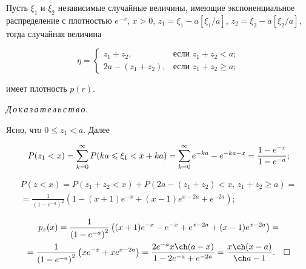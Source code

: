     \begin{lemma}{}

        Пусть $\xi_1$  и $\xi_2$ независимые случайные величины{\rm ,} имеющие экспоненциальное распределение с плотностью $e^{-x}${\rm ,} $x>0${\rm ,} $z_1=\xi_1-a\left[{\xi_1}/{a}\right]${\rm ,} $z_2=\xi_2-a[{\xi_2}/{a}]${\rm ,} тогда случайная величина

        \[

            \eta=\begin{cases}

                z_1+z_2,&\text{если $z_1+z_2<a$;}\\

                2a-(z_1+z_2),&\text{если $z_1+z_2\geqslant a;$}

            \end{cases}

        \]

        имеет плотность $p(r)${\rm .}

\end{lemma}



\smallskip

{\it Д\,о\,к\,а\,з\,а\,т\,е\,л\,ь\,с\,т\,в\,о.}

Ясно, что $0\leqslant z_1<a$. Далее

\[P(z_1<x)=\sum\limits_{k=0}^\infty P(ka\leqslant \xi_1<x+ka)=\sum\limits_{k=0}^\infty e^{-ka}-e^{-ka-x}=\frac{1-e^{-x}}{1-e^{-a}};\]

\begin{multline*}

                P(z<x)=P(z_1+z_2<x)+P(2a-(z_1+z_2)<x,\,z_1+z_2\geqslant a)=

                \\

                =\frac{1}{\left(1-e^{-a}\right)^2}\left(1-(x+1)e^{-x}+(x-1)e^{x-2a}+e^{-2a}\right);

\end{multline*}

\begin{multline*}

            p_z(x)=\frac{1}{\left(1-e^{-a}\right)^2}\left((x+1)e^{-x}-e^{-x}+e^{x-2a}+(x-1)e^{x-2a}\right)=

            \\

        =\frac{1}{\left(1-e^{-a}\right)^2}\left(xe^{-x}+xe^{x-2a}\right)=\frac{2e^{-a}x\ch(a-x)}{1-2e^{-a}+e^{-2a}}=\frac{x\ch(x-a)}{\ch a -1}.\quad \square

    \end{multline*}





